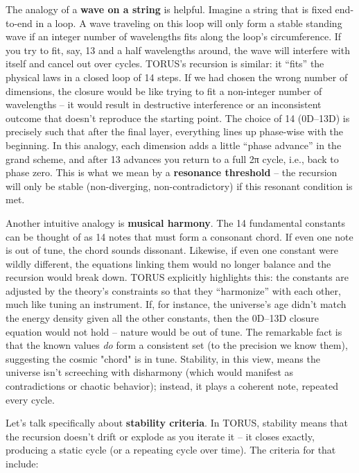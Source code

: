 \documentclass[]{article}
\begin{document}
{The analogy of a \textbf{wave on a string} is helpful. Imagine a string
that is fixed end-to-end in a loop. A wave traveling on this loop will
only form a stable standing wave if an integer number of wavelengths
fits along the loop's circumference. If you try to fit, say, 13 and a
half wavelengths around, the wave will interfere with itself and cancel
out over cycles. TORUS's recursion is similar: it ``fits'' the physical
laws in a closed loop of 14 steps. If we had chosen the wrong number of
dimensions, the closure would be like trying to fit a non-integer number
of wavelengths -- it would result in destructive interference or an
inconsistent outcome that doesn't reproduce the starting point​. The
choice of 14 (0D--13D) is precisely such that after the final layer,
everything lines up phase-wise with the beginning. In this analogy, each
dimension adds a little ``phase advance'' in the grand scheme, and after
13 advances you return to a full 2π cycle, i.e., back to phase zero​.
This is what we mean by a \textbf{resonance threshold} -- the recursion
will only be stable (non-diverging, non-contradictory) if this resonant
condition is met.

Another intuitive analogy is \textbf{musical harmony}. The 14
fundamental constants can be thought of as 14 notes that must form a
consonant chord. If even one note is out of tune, the chord sounds
dissonant. Likewise, if even one constant were wildly different, the
equations linking them would no longer balance and the recursion would
break down. TORUS explicitly highlights this: the constants are adjusted
by the theory's constraints so that they ``harmonize'' with each other,
much like tuning an instrument​. If, for instance, the universe's age
didn't match the energy density given all the other constants, then the
0D--13D closure equation would not hold -- nature would be out of tune.
The remarkable fact is that the known values \emph{do} form a consistent
set (to the precision we know them), suggesting the cosmic "chord" is in
tune. Stability, in this view, means the universe isn't screeching with
disharmony (which would manifest as contradictions or chaotic behavior);
instead, it plays a coherent note, repeated every cycle.

Let's talk specifically about \textbf{stability criteria}. In TORUS,
stability means that the recursion doesn't drift or explode as you
iterate it -- it closes exactly, producing a static cycle (or a
repeating cycle over time). The criteria for that include:

}
\end{document}
